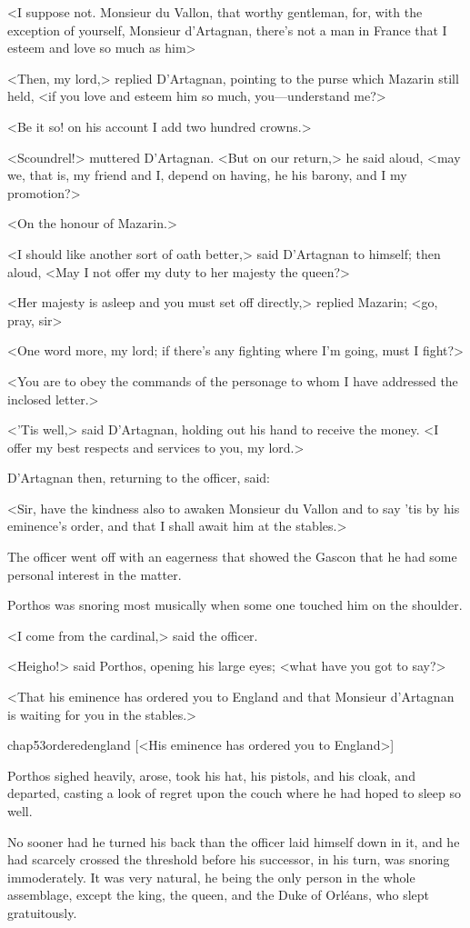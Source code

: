 <I suppose not. Monsieur du Vallon, that worthy gentleman, for, with the exception of yourself, Monsieur d'Artagnan, there's not a man in France that I esteem and love so much as him\longdash>

<Then, my lord,> replied D'Artagnan, pointing to the purse which Mazarin still held, <if you love and esteem him so much, you—understand me?>

<Be it so! on his account I add two hundred crowns.>

<Scoundrel!> muttered D'Artagnan. <But on our return,> he said aloud, <may we, that is, my friend and I, depend on having, he his barony, and I my promotion?>

<On the honour of Mazarin.>

<I should like another sort of oath better,> said D'Artagnan to himself; then aloud, <May I not offer my duty to her majesty the queen?>

<Her majesty is asleep and you must set off directly,> replied Mazarin; <go, pray, sir\longdash>

<One word more, my lord; if there's any fighting where I'm going, must I fight?>

<You are to obey the commands of the personage to whom I have addressed the inclosed letter.>

<'Tis well,> said D'Artagnan, holding out his hand to receive the money. <I offer my best respects and services to you, my lord.>

D'Artagnan then, returning to the officer, said:

<Sir, have the kindness also to awaken Monsieur du Vallon and to say 'tis by his eminence's order, and that I shall await him at the stables.>

The officer went off with an eagerness that showed the Gascon that he had some personal interest in the matter.

Porthos was snoring most musically when some one touched him on the shoulder.

<I come from the cardinal,> said the officer.

<Heigho!> said Porthos, opening his large eyes; <what have you got to say?>

<That his eminence has ordered you to England and that Monsieur d'Artagnan is waiting for you in the stables.>

\begin{bwbigpic}
	[\basicscale] 
	{chap53orderedengland}
	[<His eminence has ordered you to England>]
\end{bwbigpic}

Porthos sighed heavily, arose, took his hat, his pistols, and his cloak, and departed, casting a look of regret upon the couch where he had hoped to sleep so well.

No sooner had he turned his back than the officer laid himself down in it, and he had scarcely crossed the threshold before his successor, in his turn, was snoring immoderately. It was very natural, he being the only person in the whole assemblage, except the king, the queen, and the Duke of Orléans, who slept gratuitously. 